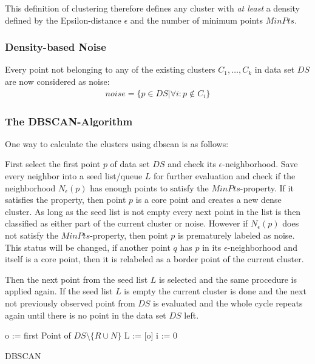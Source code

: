 This definition of clustering therefore defines any cluster with \textit{at least} a density defined by the Epsilon-distance $\epsilon$ and the number of minimum points $MinPts$.

\subsubsection*{Density-based Noise}
Every point not belonging to any of the existing clusters $C_1, \dotsc, C_k$ in data set $DS$ are now considered as noise: 
\begin{align}
    noise = \{p \in  DS | \forall i : p \notin C_i\}
\end{align}

\subsubsection*{The DBSCAN-Algorithm}
One way to calculate the clusters using \gls{dbscan} is as follows:

First select the first point $p$ of data set $DS$ and check its $\epsilon$-neighborhood. Save every neighbor into a seed list/queue $L$ for further evaluation and check if the neighborhood $N_{\epsilon}(p)$ has enough points to satisfy the $MinPts$-property. 
If it satisfies the property, then point $p$ is a core point and creates a new dense cluster. As long as the seed list is not empty every next point in the list is then classified as either part of the current cluster or noise.
However if $N_{\epsilon}(p)$ does not satisfy the $MinPts$-property, then point $p$ is prematurely labeled as noise. This status will be changed, if another point $q$ has $p$ in its $\epsilon$-neighborhood and itself is a core point, then it is relabeled as a border point of the current cluster.

Then the next point from the seed list $L$ is selected and the same procedure is applied again.
If the seed list $L$ is empty the current cluster is done and the next not previously observed point from $DS$ is evaluated and the whole cycle repeats again until there is no point in the data set $DS$ left.

\vspace{5mm}
\begin{algorithm}[H]
\SetAlgoLined
{}
 o := first Point of $DS\setminus \{R \cup N\}$\;
 L := [o]\;
 i := 0\;
 \caption{DBSCAN}
\end{algorithm}
\vspace{5mm}

